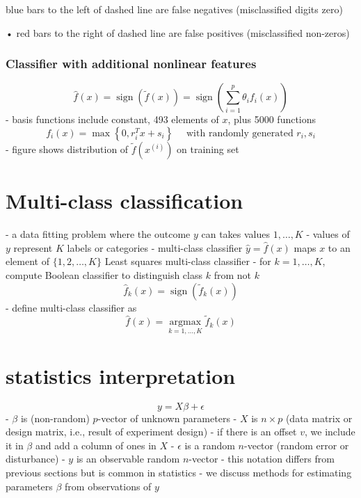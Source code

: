 blue bars to the left of dashed line are false negatives (misclassified digits zero)

• red bars to the right of dashed line are false positives (misclassified non-zeros)

\subsubsection{Classifier with additional nonlinear features}

$$
\hat{f}(x)=\operatorname{sign}(\tilde{f}(x))=\operatorname{sign}\left(\sum_{i=1}^{p} \theta_{i} f_{i}(x)\right)
$$
- basis functions include constant, 493 elements of $ x $, plus 5000 functions
$$
f_{i}(x)=\max \left\{0, r_{i}^{T} x+s_{i}\right\} \quad \text { with randomly generated } r_{i}, s_{i}
$$
- figure shows distribution of $ \tilde{f}\left(x^{(i)}\right) $ on training set

\section{Multi-class classification}

- a data fitting problem where the outcome $ y $ can takes values $ 1, \ldots, K $
- values of $ y $ represent $ K $ labels or categories
- multi-class classifier $ \hat{y}=\hat{f}(x) $ maps $ x $ to an element of $ \{1,2, \ldots, K\} $
Least squares multi-class classifier
- for $ k=1, \ldots, K $, compute Boolean classifier to distinguish class $ k $ from not $ k $
$$
\hat{f}_{k}(x)=\operatorname{sign}\left(\tilde{f}_{k}(x)\right)
$$
- define multi-class classifier as
$$
\hat{f}(x)=\underset{k=1, \ldots, K}{\operatorname{argmax}} \tilde{f}_{k}(x)
$$

\section{statistics interpretation}

$$
y=X \beta+\epsilon
$$
- $ \beta $ is (non-random) $ p $-vector of unknown parameters
- $ X $ is $ n \times p $ (data matrix or design matrix, i.e., result of experiment design)
- if there is an offset $ v $, we include it in $ \beta $ and add a column of ones in $ X $
- $ \epsilon $ is a random $ n $-vector (random error or disturbance)
- $ y $ is an observable random $ n $-vector
- this notation differs from previous sections but is common in statistics
- we discuss methods for estimating parameters $ \beta $ from observations of $ y $

